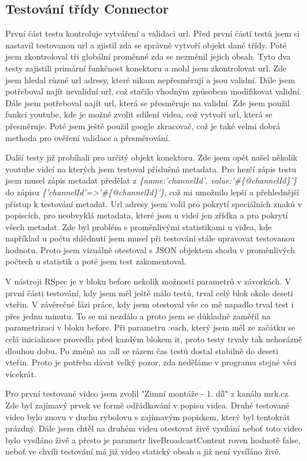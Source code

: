 \subsection{Testování třídy Connector}
\par První část testu kontroluje vytváření a validaci url. Před první částí testů jsem si nastavil testovanou url a zjistil zda se správně vytvoří objekt dané třídy. Poté jsem zkontroloval tři globální proměnné zda se nezměnil jejich obsah. Tyto dva testy zajistili primární funkčnost konektoru a mohl jsem zkontrolovat url. Zde jsem hledal různé url adresy, které nikam nepřesměrují a jsou validní. Dále jsem potřeboval najít nevalidní url, což stačilo vhodným způsobem modifikovat validní. Dále jsem potřeboval najít url, která se přesměruje na validní. Zde jsem použil funkci youtube, kde je možné zvolit sdílení videa, což vytvoří url, která se přesměruje. Poté jsem ještě použil google zkracovač, což je také velmi dobrá methoda pro ověření validace a přesměrování.
\par Další testy již probíhali pro určitý objekt konektoru. Zde jsem opět našel několik youtube videí na kterých jsem testoval příslušná metadata. Pro hezčí zápis testu jsem musel zápis metadat předělat z \textit{\{name:'channelId', value:'\#\{@channelId\}'\}} do zápisu \textit{\{'channelId'=>'\#\{@channelId\}'\}}, což mi umožnilo lepší a přehlednější přístup k testování metadat. Url adresy jsem volil pro pokrytí speciálních znaků v popiscích, pro neobvyklá metadata, které jsou u videí jen zřídka a pro pokrytí všech metadat. Zde byl problém s proměnlivými statistikami u videa, kde například u počtu shlédnutí jsem musel při testování stále upravovat testovanou hodnotu. Proto jsem vizuálně otestoval s JSON objektem shodu v proměnlivých počtech u statistik a poté jsem test zakomentoval.
\par V nástroji RSpec je v bloku before nekolik možností parametrů v závorkách. V první části testování, kdy jsem měl ještě málo testů, trval celý blok okolo deseti vteřin. V závěrečné fázi práce, kdy jsem otestoval vše co mě napadlo trval test i přes jednu minutu. To se mi nezdálo a proto jsem se důkladně zaměřil na parametrizaci v bloku before. Při parametru :each, který jsem měl ze začátku se celá inicializace provedla před kazdým blokem it, proto testy trvaly tak nehorázně dlouhou dobu. Po změně na :all se rázem čas testů dostal stabilně do deseti vteřin. Proto je potřeba dávat velký pozor, zda neděláme v programu stejné věci vícekrát.
\par Pro první testované video jsem zvolil "Zimní montáže - 1. díl" z kanálu mrk.cz. Zde byl zajímavý prvek ve formě odřádkování v popisu videa. Druhé testované video bylo znovu v duchu rybolovu s zajímavým popiskem, který byl tentokrát prázdný. Dále jsem chtěl na druhém videu otestovat živé vysílání neboť toto video bylo vysíláno živě a přesto je parametr liveBroadcastContent roven hodnotě false, neboť ve chvíli testování má již video statický obsah a již není vysíláno živě.
